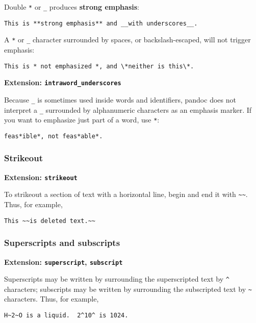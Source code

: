 \documentclass[]{article}
\begin{document}
Double \texttt{*} or \texttt{\_} produces \textbf{strong emphasis}:

\begin{verbatim}
This is **strong emphasis** and __with underscores__.
\end{verbatim}

A \texttt{*} or \texttt{\_} character surrounded by spaces, or
backslash-escaped, will not trigger emphasis:

\begin{verbatim}
This is * not emphasized *, and \*neither is this\*.
\end{verbatim}

\textbf{Extension: \texttt{intraword\_underscores}}

Because \texttt{\_} is sometimes used inside words and identifiers,
pandoc does not interpret a \texttt{\_} surrounded by alphanumeric
characters as an emphasis marker. If you want to emphasize just part of
a word, use \texttt{*}:

\begin{verbatim}
feas*ible*, not feas*able*.
\end{verbatim}

\subsubsection{Strikeout}

\textbf{Extension: \texttt{strikeout}}

To strikeout a section of text with a horizontal line, begin and end it
with \texttt{\textasciitilde{}\textasciitilde{}}. Thus, for example,

\begin{verbatim}
This ~~is deleted text.~~
\end{verbatim}

\subsubsection{Superscripts and subscripts}

\textbf{Extension: \texttt{superscript}, \texttt{subscript}}

Superscripts may be written by surrounding the superscripted text by
\texttt{\^{}} characters; subscripts may be written by surrounding the
subscripted text by \texttt{\textasciitilde{}} characters. Thus, for
example,

\begin{verbatim}
H~2~O is a liquid.  2^10^ is 1024.
\end{verbatim}
\end{document}
